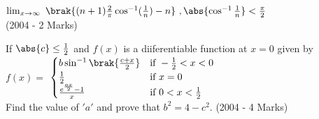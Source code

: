 	$\lim_{x \to \infty}\ \brak{(n+1)\frac{2}{\pi}\cos^{-1}(\frac{1}{n})-n}\ , \abs{\cos^{-1}\frac{1}{n}}<\frac{\pi}{2}$\\  
\hfill (2004 - 2 Marks)
\item If $\abs{c} \leq \frac{1}{2}$ and $f(x)$ is a diiferentiable function at $x = 0$ given by\\
$f(x) = $
$\begin{cases}
	b\sin^{-1}\brak{\frac{c + x}{2}} & \text{if}\ -\frac{1}{2}<x<0\\
    \frac{1}{2} & \text{if}\ x=0\\
    \frac{e^\frac{ax}{2} - 1}{x} & \text{if}\ 0<x<\frac{1}{2}
\end{cases}$\\
Find the value of $'a'$ and prove that $b^2 = 4 - c^2$.
\hfill (2004 - 4 Marks)






      

%



























            

